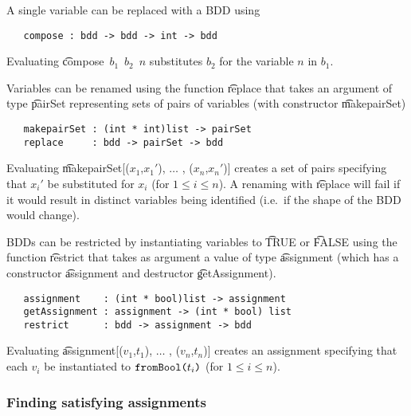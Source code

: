 A single variable can be replaced with a BDD using

\begin{verbatim}
   compose : bdd -> bdd -> int -> bdd
\end{verbatim}

Evaluating \t{compose~$b_1$~$b_2$~$n$} substitutes $b_2$ for the
variable $n$ in $b_1$.

Variables can be renamed using the function \t{replace} that takes
an argument of type \t{pairSet} representing sets of pairs of variables
(with constructor \t{makepairSet})

\begin{verbatim}
   makepairSet : (int * int)list -> pairSet
   replace     : bdd -> pairSet -> bdd
\end{verbatim}

Evaluating \t{makepairSet[($x_1$,$x_1'$), $\ldots$ , ($x_n$,$x_n'$)]}
creates a set of pairs specifying that $x_i'$ be substituted for $x_i$
(for $1\leq i\leq n$).  A renaming with \t{replace} will fail if it
would result in distinct variables being identified (i.e.~if the shape of the BDD would change).

BDDs can be restricted by instantiating variables to {\t{TRUE}} or
{\t{FALSE}} using the function \t{restrict} that takes
as argument a value of type \t{assignment}
(which has a constructor \t{assignment} and destructor \t{getAssignment}).

\begin{verbatim}
   assignment    : (int * bool)list -> assignment
   getAssignment : assignment -> (int * bool) list
   restrict      : bdd -> assignment -> bdd
\end{verbatim}

Evaluating \t{assignment[($v_1$,$t_1$), $\ldots$ , ($v_n$,$t_n$)]}
creates an assignment specifying that each $v_i$ be instantiated to
$\mbox{\tt fromBool(}t_i\mbox{\tt )}$ (for $1{\leq}i{\leq}n$). 


\subsubsection{Finding satisfying assignments}

